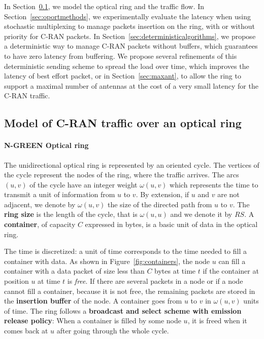 In Section~\ref{sec:modelngreen}, we model the optical ring and the traffic flow. In Section~\ref{sec:oportmethods}, we experimentally evaluate the latency when using stochastic multiplexing to manage packets insertion on the ring, with or without priority for C-RAN packets. In Section~\ref{sec:deterministicalgorithms}, we propose a deterministic way to manage C-RAN packets without buffers, which guarantees to have zero latency from buffering. We propose several refinements of this deterministic sending scheme to spread the load over time, which improves the latency of best effort packet, or in Section~\ref{sec:maxant}, to allow the ring to support a maximal number of antennas at the cost of a very small latency for the C-RAN traffic. 

\subsection{Model of C-RAN traffic over an optical ring}
\label{sec:modelngreen}
    
  \paragraph{N-GREEN Optical ring}
   
  The unidirectional optical ring is represented by an oriented cycle. The vertices of the cycle represent the nodes of the ring, where the traffic arrives. The arcs $(u,v)$ of the cycle have an integer weight $\omega(u,v)$ which represents the time to transmit a unit of information from $u$ to $v$. By extension, if $u$ and $v$ are not adjacent, we denote by $\omega(u,v)$ the size of the directed path from $u$ to $v$.  The \textbf{ring size} is the length of the cycle, that is $\omega(u,u)$ and we denote it by $RS$. A {\bf container}, of capacity $C$  expressed in bytes, is a basic unit of data in the optical ring. 
  
  The time is discretized: a unit of time corresponds to the time needed to fill a container with data.
  As shown in Figure~\ref{fig:containers}, the node $u$ can fill a container with a data packet of size less than $C$ bytes at time $t$ if the container at position $u$ at time $t$ is \emph{free}. 
  If there are several packets in a node or if a node cannot fill a container, because it is not free, 
  the remaining packets are stored in the {\bf insertion buffer} of the node. 
  A container goes from $u$ to $v$ in $\omega(u,v)$ units of time. The ring follows a {\bf broadcast and select scheme with emission release policy}: When a container is filled by some node $u$, it is freed when it comes back at $u$ after going through the whole cycle.
   
